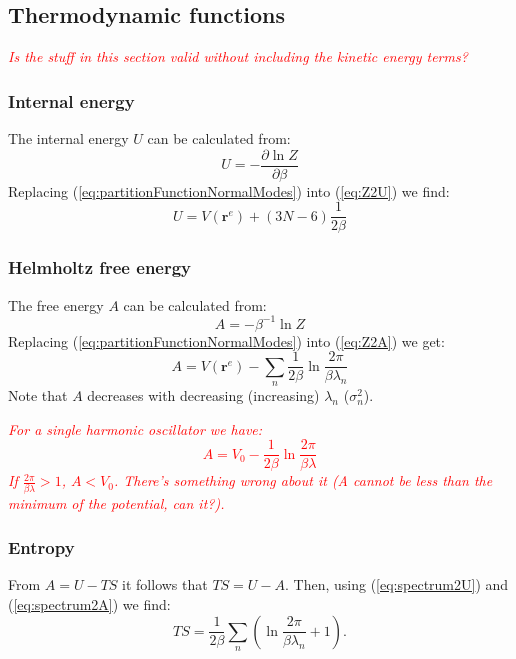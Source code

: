 \documentclass[12pt]{article}
\newcommand{\comment}[1]{\emph{\textcolor{red} {#1}}}
\newcommand{\rvectorEq}{\mathbf{r}^{e}}
\begin{document}
\subsection{Thermodynamic functions}

\comment{Is the stuff in this section valid without including the kinetic energy terms?}

\subsubsection{Internal energy}

The internal energy $U$ can  be calculated from:
\begin{equation} \label{eq:Z2U}
U = - \frac{\partial \ln Z}{\partial \beta}
\end{equation}
Replacing (\ref{eq:partitionFunctionNormalModes}) into (\ref{eq:Z2U}) we find:
\begin{equation} \label{eq:spectrum2U}
U = V(\rvectorEq) + (3N - 6) \frac{1}{2\beta}
\end{equation}

\subsubsection{Helmholtz free energy}

The free energy $A$ can be calculated from:
\begin{equation} \label{eq:Z2A}
A = - \beta^{-1} \ln Z
\end{equation}
Replacing (\ref{eq:partitionFunctionNormalModes}) into (\ref{eq:Z2A}) we get:
\begin{equation} \label{eq:spectrum2A}
A = V(\rvectorEq) - \sum_{n} \frac{1}{2\beta} \ln \frac{2\pi}{\beta \lambda_n}
\end{equation}
Note that $A$ decreases with decreasing (increasing) $\lambda_n$ ($\sigma_n^2$). 

\comment{
For a single harmonic oscillator we have:
\begin{equation} 
A = V_0 - \frac{1}{2\beta} \ln \frac{2\pi}{\beta \lambda}
\end{equation}
If $\frac{2 \pi}{\beta \lambda} > 1$, $A < V_0$. There's something wrong about it (A cannot be less than the minimum of the potential, can it?). }

\subsubsection{Entropy}
From $A = U - TS$ it follows that $TS = U - A$. Then, using (\ref{eq:spectrum2U}) and (\ref{eq:spectrum2A}) we find:
\begin{equation}
T S = \frac{1}{2\beta}\sum_{n}\left(\ln\frac{2\pi}{\beta \lambda_n} +1 \right).
\end{equation}
\end{document}
